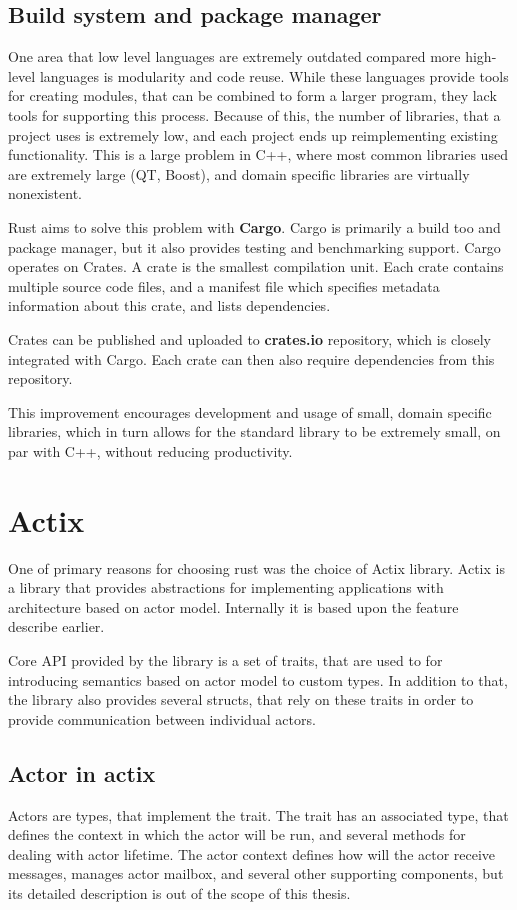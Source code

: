 \subsection{Build system and package manager}
One area that low level languages are extremely outdated compared more high-level languages is modularity and code reuse.
While these languages provide tools for creating modules, that can be combined to form a larger program, they lack tools
for supporting this process. Because of this, the number of libraries, that a project uses is extremely low, and
each project ends up reimplementing existing functionality. This is a large problem in C++, where most common
libraries used are extremely large (QT, Boost), and domain specific libraries are virtually nonexistent.

Rust aims to solve this problem with \textbf{Cargo}. Cargo is primarily a build too and package manager, but it also
provides testing and benchmarking support. Cargo operates on Crates. A crate is the smallest compilation unit.
Each crate contains multiple source code files, and a manifest file which specifies metadata information about this crate, and lists dependencies.

Crates can be published and uploaded to \textbf{crates.io} repository, which is closely integrated with Cargo. Each crate can then
also require dependencies from this repository.

This improvement encourages development and usage of small, domain specific libraries, which in
turn allows for the standard library to be extremely small, on par with C++, without reducing productivity.

\section{Actix}
One of primary reasons for choosing rust was the choice of Actix\cite{web:actix} library. Actix is a library that provides abstractions
for implementing applications with architecture based on actor model. Internally it is based upon the  feature describe earlier.

Core API provided by the library is a set of traits, that are used to for introducing semantics based on actor model to
custom types. In addition to that, the library also provides several structs, that rely on these traits in order
to provide communication between individual actors.

\subsection{Actor in actix}
Actors are types, that implement the  trait. The  trait has an associated type, that defines the context in which the actor will be run,
and several methods for dealing with actor lifetime.
The actor context defines how will the actor receive messages, manages actor mailbox, and several other
supporting components, but its detailed description is out of the scope of this thesis.

